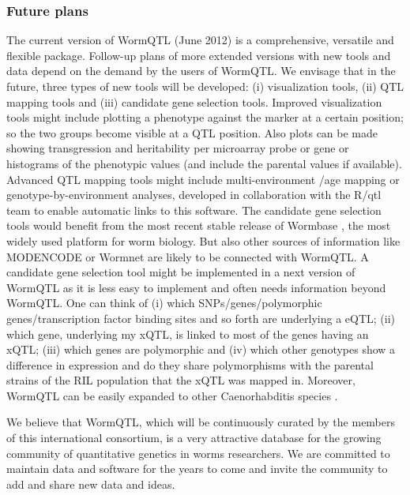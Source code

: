 \subsubsection{Future plans}
The current version of WormQTL (June 2012) is a comprehensive, versatile and flexible package. 
Follow-up plans of more extended versions with new tools and data depend on the demand by the 
users of WormQTL. We envisage that in the future, three types of new tools will be developed: 
(i) visualization tools, (ii) QTL mapping tools and (iii) candidate gene selection tools. Improved 
visualization tools might include plotting a phenotype against the marker at a certain position; 
so the two groups become visible at a QTL position. Also plots can be made showing transgression 
and heritability per microarray probe or gene or histograms of the phenotypic values (and include 
the parental values if available). Advanced QTL mapping tools might include multi-environment
/age mapping or genotype-by-environment analyses, developed in collaboration with the R/qtl team 
to enable automatic links to this software. The candidate gene selection tools would benefit from 
the most recent stable release of Wormbase \cite{Yook:2012}, the most widely used platform for worm biology. 
But also other sources of information like MODENCODE \cite{Gerstein:2010} or Wormnet 
\cite{Lee:2008} are likely to be connected with WormQTL. A candidate gene selection tool might be 
implemented in a next version 
of WormQTL as it is less easy to implement and often needs information beyond WormQTL. One can 
think of (i) which SNPs/genes/polymorphic genes/transcription factor binding sites and so forth 
are underlying a eQTL; (ii) which gene, underlying my xQTL, is linked to most of the genes 
having an xQTL; (iii) which genes are polymorphic and (iv) which other genotypes show a difference 
in expression and do they share polymorphisms with the parental strains of the RIL population 
that the xQTL was mapped in. Moreover, WormQTL can be easily expanded to other Caenorhabditis 
species \cite{Ross:2011}.

We believe that WormQTL, which will be continuously curated by the members of this international 
consortium, is a very attractive database for the growing community of quantitative genetics in 
worms researchers. We are committed to maintain data and software for the years to come and invite 
the community to add and share new data and ideas.

